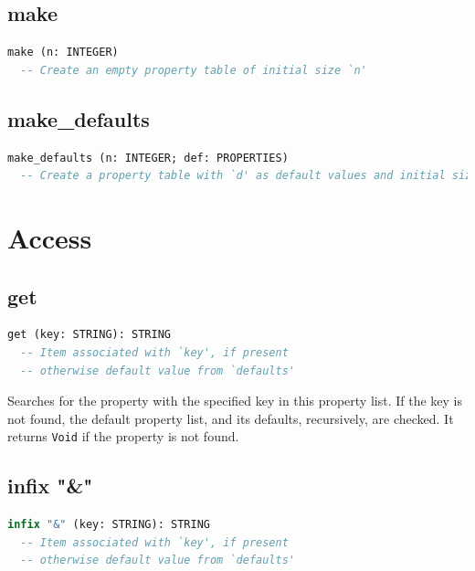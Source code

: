 \documentclass[a4paper,fleqn]{report}
\begin{document}
\subsection{make}
\label{sec:make}

\begin{lstlisting}[language=Eiffel]
make (n: INTEGER)
  -- Create an empty property table of initial size `n'
\end{lstlisting}


\subsection{make\_defaults}
\label{sec:make_defaults}

\begin{lstlisting}[language=Eiffel]
make_defaults (n: INTEGER; def: PROPERTIES)
  -- Create a property table with `d' as default values and initial size `n'
\end{lstlisting}


\section{Access}
\label{sec:access}


\subsection{get}
\label{sec:get}

\begin{lstlisting}[language=Eiffel]
get (key: STRING): STRING
  -- Item associated with `key', if present
  -- otherwise default value from `defaults'
\end{lstlisting}

Searches for the property with the specified key in this property
list. If the key is not found, the default property list, and its
defaults, recursively, are checked. It returns \texttt{Void} if the
property is not found.


\subsection{infix "\&"}
\label{sec:infix_ampersand}

\begin{lstlisting}[language=Eiffel]
infix "&" (key: STRING): STRING
  -- Item associated with `key', if present
  -- otherwise default value from `defaults'
\end{lstlisting}
\end{document}
